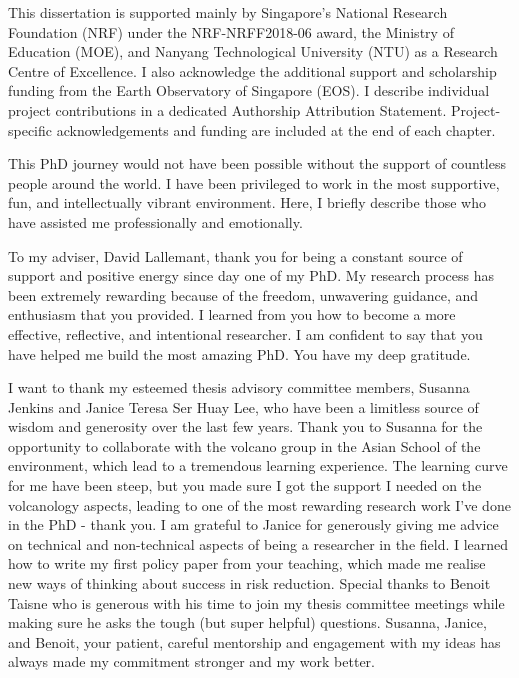 \acknowledgements
{

This dissertation is supported mainly by Singapore's National Research Foundation (NRF) under the NRF-NRFF2018-06 award, the Ministry of Education (MOE), and Nanyang Technological University (NTU) as a Research Centre of Excellence. I also acknowledge the additional support and scholarship funding from the Earth Observatory of Singapore (EOS). I describe individual project contributions in a dedicated Authorship Attribution Statement. Project-specific acknowledgements and funding are included at the end of each chapter.

This PhD journey would not have been possible without the support of countless people around the world. I have been privileged to work in the most supportive, fun, and intellectually vibrant environment. Here, I briefly describe those who have assisted me professionally and emotionally. 

To my adviser, David Lallemant, thank you for being a constant source of support and positive energy since day one of my PhD. My research process has been extremely rewarding because of the freedom, unwavering guidance, and enthusiasm that you provided. I learned from you how to become a more effective, reflective, and intentional researcher. I am confident to say that you have helped me build the most amazing PhD. You have my deep gratitude.

I want to thank my esteemed thesis advisory committee members, Susanna Jenkins and Janice Teresa Ser Huay Lee, who have been a limitless source of wisdom and generosity over the last few years. Thank you to Susanna for the opportunity to collaborate with the volcano group in the Asian School of the environment, which lead to a tremendous learning experience. The learning curve for me have been steep, but you made sure I got the support I needed on the volcanology aspects, leading to one of the most rewarding research work I've done in the PhD - thank you. I am grateful to Janice for generously giving me advice on technical and non-technical aspects of being a researcher in the field. I learned how to write my first policy paper from your teaching, which made me realise new ways of thinking about success in risk reduction. Special thanks to Benoit Taisne who is generous with his time to join my thesis committee meetings while making sure he asks the tough (but super helpful) questions. Susanna, Janice, and Benoit, your patient, careful mentorship and engagement with my ideas has always made my commitment stronger and my work better. 

}
